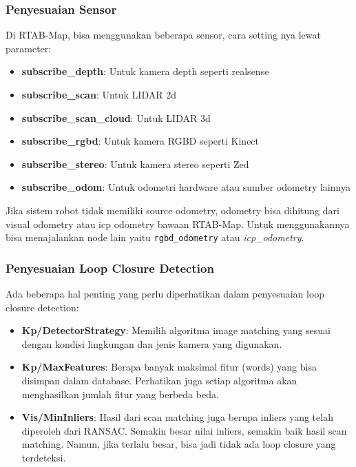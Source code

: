 \documentclass{article}
\begin{document}
\subsubsection{Penyesuaian Sensor}
Di RTAB-Map, bisa menggunakan beberapa sensor, cara setting nya lewat parameter:
\begin{itemize}
  \item \textbf{subscribe\_depth}: Untuk kamera depth seperti realsense
  \item \textbf{subscribe\_scan}: Untuk LIDAR 2d
  \item \textbf{subscribe\_scan\_cloud}: Untuk LIDAR 3d
  \item \textbf{subscribe\_rgbd}: Untuk kamera RGBD seperti Kinect
  \item \textbf{subscribe\_stereo}: Untuk kamera stereo seperti Zed
  \item \textbf{subscribe\_odom}: Untuk odometri hardware atau sumber odometry lainnya
\end{itemize}
Jika sistem robot tidak memiliki source odometry, odometry bisa dihitung dari visual odometry atau icp odometry bawaan RTAB-Map. Untuk menggunakannya bisa menajalankan node lain yaitu \texttt{rgbd\_odometry} atau \textit{icp\_odometry}.

\subsubsection{Penyesuaian Loop Closure Detection}
Ada beberapa hal penting yang perlu diperhatikan dalam penyesuaian loop closure detection:
\begin{itemize}
  \item \textbf{Kp/DetectorStrategy}: Memilih algoritma image matching yang sesuai dengan kondisi lingkungan dan jenis kamera yang digunakan.
  \item \textbf{Kp/MaxFeatures}: Berapa banyak maksimal fitur (words) yang bisa disimpan dalam database. Perhatikan juga setiap algoritma akan menghasilkan jumlah fitur yang berbeda beda.
  \item \textbf{Vis/MinInliers}: Hasil dari scan matching juga berupa inliers yang telah diperoleh dari RANSAC. Semakin besar nilai inliers, semakin baik hasil scan matching. Namun, jika terlalu besar, bisa jadi tidak ada loop closure yang terdeteksi.
\end{itemize}
\end{document}
